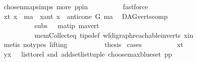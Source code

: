 \begin{isabellebody}
\ chosen{\isacharunderscore}{\kern0pt}map{\isacharunderscore}{\kern0pt}simps{\isacharparenleft}{\kern0pt}{}{\isacharparenright}{\kern0pt}\ more\ pp{\isacharunderscore}{\kern0pt}in\isanewline
\ \ \ \ \ \ \ \ \isamarkupfalse%
\ fastforce\ \isanewline
\ \ \ \ \ \ \isamarkupfalse%
\ {\isacharparenleft}{\kern0pt}x{\isacharunderscore}{\kern0pt}t{\isacharparenright}{\kern0pt}\ {\isachardoublequoteopen}x\ {\isacharequal}{\kern0pt}\ ma{\isachardoublequoteclose}\ {\isacharbar}{\kern0pt}\ {\isacharparenleft}{\kern0pt}x{\isacharunderscore}{\kern0pt}ant{\isacharparenright}{\kern0pt}\ {\isachardoublequoteopen}x\ {\isasymin}\ anticone\ G\ ma{\isachardoublequoteclose}\ \isamarkupfalse%
\ DAG{\isachardot}{\kern0pt}verts{\isacharunderscore}{\kern0pt}comp{}\ \isanewline
\ \ \ \ \ \ \ \ \ \ subs{\isacharparenleft}{\kern0pt}{}{\isacharcomma}{\kern0pt}{}{\isacharparenright}{\kern0pt}\ {}\ \ ma{\isacharunderscore}{\kern0pt}tip\ ma{\isacharunderscore}{\kern0pt}vert\ \isanewline
\ \ \ \ \ \ \ \ \ \ mem{\isacharunderscore}{\kern0pt}Collect{\isacharunderscore}{\kern0pt}eq\ tips{\isacharunderscore}{\kern0pt}def\ wf{\isacharunderscore}{\kern0pt}digraph{\isachardot}{\kern0pt}reachable{}{\isacharunderscore}{\kern0pt}in{\isacharunderscore}{\kern0pt}verts{\isacharparenleft}{\kern0pt}{}{\isacharparenright}{\kern0pt}\ x{\isacharunderscore}{\kern0pt}in\isanewline
\ \ \ \ \ \ \ \ \isamarkupfalse%
\ {\isacharparenleft}{\kern0pt}metis\ {\isacharparenleft}{\kern0pt}no{\isacharunderscore}{\kern0pt}types{\isacharcomma}{\kern0pt}\ lifting{\isacharparenright}{\kern0pt}{\isacharparenright}{\kern0pt}\ \isanewline
\ \ \ \ \ \ \isamarkupfalse%
\ \isamarkupfalse%
\ {\isacharquery}{\kern0pt}thesis\ \isamarkupfalse%
{\isacharparenleft}{\kern0pt}cases{\isacharparenright}{\kern0pt}\isanewline
\ \ \ \ \ \ \ \ \isamarkupfalse%
\ x{\isacharunderscore}{\kern0pt}t\isanewline
\ \ \ \ \ \ \ \ \isamarkupfalse%
\ \isamarkupfalse%
\ {\isachardoublequoteopen}{\isacharparenleft}{\kern0pt}y{\isacharcomma}{\kern0pt}x{\isacharparenright}{\kern0pt}\ {\isasymin}\ \ list{\isacharunderscore}{\kern0pt}to{\isacharunderscore}{\kern0pt}rel\ {\isacharparenleft}{\kern0pt}snd\ {\isacharparenleft}{\kern0pt}add{\isacharunderscore}{\kern0pt}set{\isacharunderscore}{\kern0pt}list{\isacharunderscore}{\kern0pt}tuple\ {\isacharparenleft}{\kern0pt}choose{\isacharunderscore}{\kern0pt}max{\isacharunderscore}{\kern0pt}blue{\isacharunderscore}{\kern0pt}set\ pp{\isacharparenright}{\kern0pt}{\isacharparenright}{\kern0pt}{\isacharparenright}{\kern0pt}{\isachardoublequoteclose}\isanewline

\end{isabellebody}
